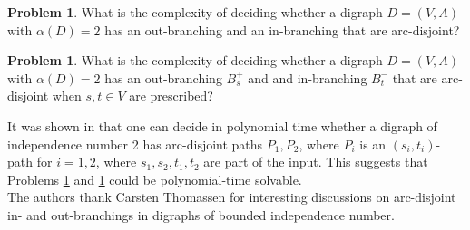 \documentclass{article}
\theoremstyle{definition}
\newtheorem{problem}[theorem]{Problem}
\newcommand{\2}{\vspace{0.2cm}}
\begin{document}
\begin{problem}
  \label{prob:disjB}
  What is the complexity of deciding whether a digraph $D=(V,A)$ with
  $\alpha{}(D)=2$ has an out-branching and an in-branching that are
  arc-disjoint?
\end{problem}


\begin{problem}
\label{prob:disjBroots}
  What is the complexity of deciding whether a digraph $D=(V,A)$ with $\alpha{}(D)=2$  has an out-branching $B_s^+$ and and in-branching $B_t^-$ that are arc-disjoint when $s,t\in V$ are prescribed? 
\end{problem}

It was shown in \cite{fradkinJCT110} that one can decide in polynomial time whether a digraph of independence number 2 has arc-disjoint paths $P_1,P_2$, where $P_i$ is an $(s_i,t_i)$-path for $i=1,2$, where $s_1,s_2,t_1,t_2$ are part of the input. This suggests that Problems \ref{prob:disjB} and \ref{prob:disjBroots} could be polynomial-time solvable.\\



 The authors thank Carsten Thomassen for interesting discussions on arc-disjoint in- and out-branchings in digraphs of bounded independence number.
\end{document}
